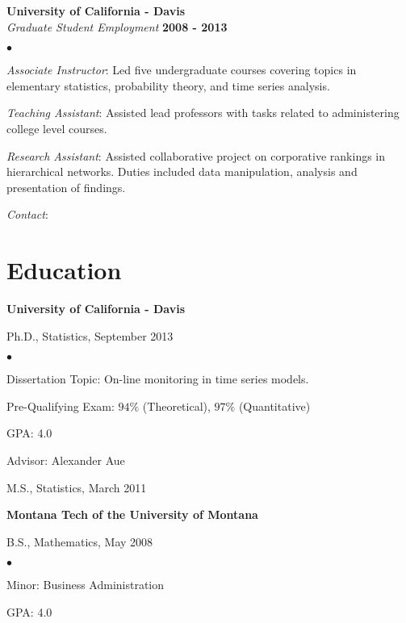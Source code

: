 \documentclass[margin,line]{res}
\newenvironment{list1}{
  \begin{list}{\ding{113}}{%
      \setlength{\itemsep}{0in}
      \setlength{\parsep}{0in} \setlength{\parskip}{0in}
      \setlength{\topsep}{0in} \setlength{\partopsep}{0in}
      \setlength{\leftmargin}{0.17in}}}{\end{list}}
\newenvironment{list2}{
  \begin{list}{$\bullet$}{%
      \setlength{\itemsep}{0in}
      \setlength{\parsep}{0in} \setlength{\parskip}{0in}
      \setlength{\topsep}{0in} \setlength{\partopsep}{0in}
      \setlength{\leftmargin}{0.2in}}}{\end{list}}
\begin{document}
\begin{resume}
{\bf University of California - Davis}\\

\vspace{-.75cm}
{\em Graduate Student Employment} \hfill {\bf 2008 - 2013}\\
\begin{list2}
\item {\em Associate Instructor}: Led five undergraduate courses covering topics in elementary statistics, probability theory, and time series analysis.\\[-.25cm]
\item {\em Teaching Assistant}: Assisted lead professors with tasks related to administering college level courses.\\[-.25cm]
\item {\em Research Assistant}: Assisted collaborative project on corporative rankings in hierarchical networks. Duties included data manipulation, analysis and presentation of findings.\\[-.25cm]
\item {\em Contact}: 
\end{list2}


\section{\sc Education}
{\bf University of California - Davis}\\
\vspace*{-.1in}
\begin{list1}
\item[] Ph.D., Statistics, September 2013
\begin{list2}
\vspace*{.05in}
\item Dissertation Topic:  On-line monitoring in time series models.
\item Pre-Qualifying Exam: $94\%$ (Theoretical), $97\%$ (Quantitative)
\item GPA: 4.0
\item Advisor: Alexander Aue 
\end{list2}
\vspace*{.05in}
\item[] M.S., Statistics,  March 2011
\end{list1}

{\bf Montana Tech of the University of Montana}\\
\vspace*{-.1in}
\begin{list1}
\item[] B.S., Mathematics,  May 2008
\begin{list2}
\vspace*{.05in}
\item Minor: Business Administration
\item GPA: 4.0
\end{list2}
\end{list1}


\end{resume}
\end{document}
